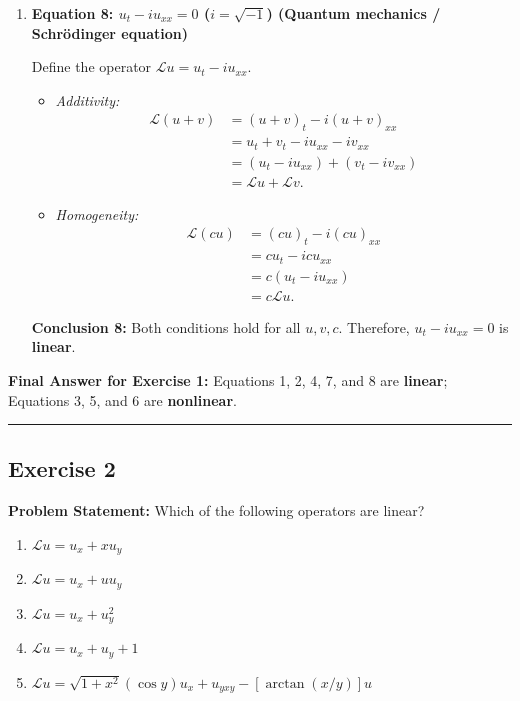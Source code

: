 \documentclass[11pt,a4paper]{article}
\begin{document}
\begin{enumerate}[label=\textbf{\arabic*.}]
    \item \textbf{Equation 8: $u_t - i u_{xx} = 0$ ($i = \sqrt{-1}$) (Quantum mechanics / Schr\"{o}dinger equation)}
    
    Define the operator $\mathcal{L}u = u_t - i u_{xx}$.
    \begin{itemize}
        \item \emph{Additivity:}
        \begin{align*}
            \mathcal{L}(u + v) &= (u + v)_t - i(u + v)_{xx} \\
            &= u_t + v_t - i u_{xx} - i v_{xx} \\
            &= (u_t - i u_{xx}) + (v_t - i v_{xx}) \\
            &= \mathcal{L}u + \mathcal{L}v.
        \end{align*}
        \item \emph{Homogeneity:}
        \begin{align*}
            \mathcal{L}(cu) &= (cu)_t - i(cu)_{xx} \\
            &= c u_t - i c u_{xx} \\
            &= c(u_t - i u_{xx}) \\
            &= c\mathcal{L}u.
        \end{align*}
    \end{itemize}
    \textbf{Conclusion 8:} Both conditions hold for all $u, v, c$. Therefore, $u_t - i u_{xx} = 0$ is \textbf{linear}.
\end{enumerate}

\textbf{Final Answer for Exercise 1:} Equations 1, 2, 4, 7, and 8 are \textbf{linear}; Equations 3, 5, and 6 are \textbf{nonlinear}.

\bigskip
\hrule
\bigskip

\subsection*{Exercise 2}
\textbf{Problem Statement:} Which of the following operators are linear?
\begin{enumerate}[label=(\alph*)]
    \item $\mathcal{L}u = u_x + x u_y$
    \item $\mathcal{L}u = u_x + u u_y$
    \item $\mathcal{L}u = u_x + u_y^2$
    \item $\mathcal{L}u = u_x + u_y + 1$
    \item $\mathcal{L}u = \sqrt{1 + x^2}(\cos y)u_x + u_{yxy} - [\arctan(x/y)]u$
\end{enumerate}
\end{document}
